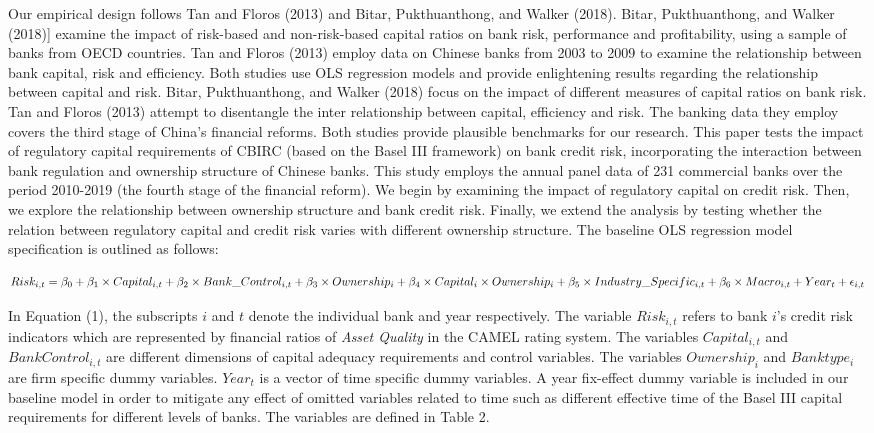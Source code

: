 \documentclass{article}
\begin{document}
Our empirical design follows Tan and Floros (2013) and Bitar,
Pukthuanthong, and Walker (2018). Bitar, Pukthuanthong, and Walker
(2018){]} examine the impact of risk-based and non-risk-based capital
ratios on bank risk, performance and profitability, using a sample of
banks from OECD countries. Tan and Floros (2013) employ data on Chinese
banks from 2003 to 2009 to examine the relationship between bank
capital, risk and efficiency. Both studies use OLS regression models and
provide enlightening results regarding the relationship between capital
and risk. Bitar, Pukthuanthong, and Walker (2018) focus on the impact of
different measures of capital ratios on bank risk. Tan and Floros (2013)
attempt to disentangle the inter relationship between capital,
efficiency and risk. The banking data they employ covers the third stage
of China's financial reforms. Both studies provide plausible benchmarks
for our research. This paper tests the impact of regulatory capital
requirements of CBIRC (based on the Basel III framework) on bank credit
risk, incorporating the interaction between bank regulation and
ownership structure of Chinese banks. This study employs the annual
panel data of 231 commercial banks over the period 2010-2019 (the fourth
stage of the financial reform). We begin by examining the impact of
regulatory capital on credit risk. Then, we explore the relationship
between ownership structure and bank credit risk. Finally, we extend the
analysis by testing whether the relation between regulatory capital and
credit risk varies with different ownership structure. The baseline OLS
regression model specification is outlined as follows:

\[Risk_{i, t} = \beta_0 + \beta_1 \times Capital_{i, t} + \beta_2 \times Bank\_Control_{i, t} + \beta_3 \times Ownership_i + \\
\beta_4 \times Capital_i \times Ownership_i + \beta_5 \times Industry\_Specific_{i,t}  + \beta_6 \times Macro_{i,t} + Year_t + \epsilon_{i,t}\]

In Equation (1), the subscripts \(i\) and \(t\) denote the individual
bank and year respectively. The variable \(Risk_{i,t}\) refers to bank
\(i\)'s credit risk indicators which are represented by financial ratios
of \emph{Asset Quality} in the CAMEL rating system. The variables
\(Capital_{i,t}\) and \(BankControl_{i,t}\) are different dimensions of
capital adequacy requirements and control variables. The variables
\(Ownership_i\) and \(Banktype_i\) are firm specific dummy variables.
\(Year_t\) is a vector of time specific dummy variables. A year
fix-effect dummy variable is included in our baseline model in order to
mitigate any effect of omitted variables related to time such as
different effective time of the Basel III capital requirements for
different levels of banks. The variables are defined in Table 2.
\end{document}
